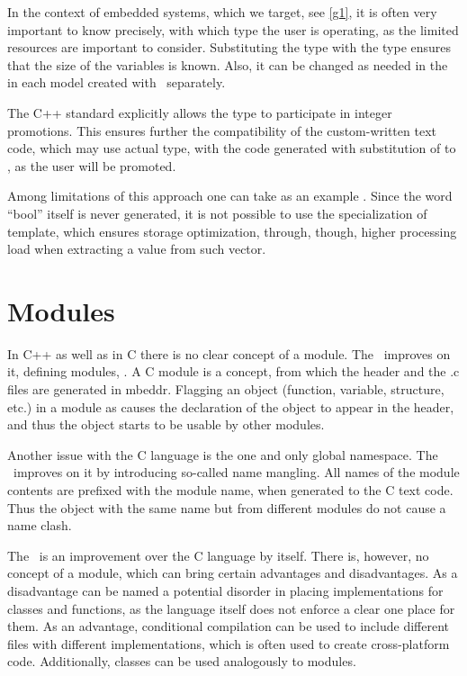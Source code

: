 In the context of embedded systems, which we target, see \ref{g1}, it is often very important to 
know precisely, with which type the user is operating, as the limited resources
are important to consider. Substituting the  type with the  type ensures that the size of the  variables is known.
Also, it can be changed as needed in the  in each model created with \mb\ separately.

The C++ standard explicitly allows the  type to participate in integer promotions. This ensures further the compatibility of the custom-written
text code, which may use actual  type, with the code generated with substitution of  to , as the user  will be promoted.

Among limitations of this approach one can take as an example . Since the word ``bool'' itself is never generated, 
it is not possible to use the specialization of template, which ensures storage optimization, through, though, higher processing load when
extracting a value from such vector.

\section{Modules}

In C++ as well as in C there is no clear concept of a module. The \mbp\ improves on it, defining 
modules, \cite{Voelter:MoDELS:2010}. A C module is a concept, from which the header and the .c files are generated in mbeddr.
Flagging an object (function, variable, structure, etc.) in a module as  causes the declaration of the object to appear
in the header, and thus the object starts to be usable by other modules.

Another issue with the C language is the one and only global namespace. The \mbp\ improves on it 
by introducing so-called name mangling. All names of the module contents are prefixed with the module name,
when generated to the C text code. Thus the object with the same name but from different modules do
not cause a name clash.

The \cpppl\ is an improvement over the C language by itself. There is, however, no concept of a module,
which can bring certain advantages and disadvantages. As a disadvantage can be named a potential disorder
in placing implementations for classes and functions, as the language itself does not enforce a clear
one place for them. As an advantage, conditional compilation can be used to include different files
with different implementations, which is often used to create cross-platform code. Additionally, classes
can be used analogously to modules.

